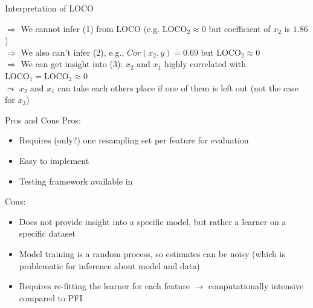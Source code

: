 \documentclass[11pt,compress,t,notes=noshow, aspectratio=169, xcolor=table]{beamer}
\begin{document}
\begin{frame}{Interpretation of LOCO}
\lz\pause

$\Rightarrow$ We cannot infer (1) from LOCO (e.g. $\text{LOCO}_2 \approx 0$ but coefficient of $x_2$ is $1.86$)\\\pause
$\Rightarrow$ We also can't infer (2), e.g., $Cor(x_2, y) = 0.69$ but $\text{LOCO}_2 \approx 0$\\\pause
$\Rightarrow$ We can get insight into (3): $x_2$ and $x_1$ highly correlated with $\text{LOCO}_1 = \text{LOCO}_2  \approx 0$ \\
\phantom{$\Rightarrow$} $\leadsto$ $x_2$ and $x_1$ can take each others place if one of them is left out (not the case for $x_3$)
\end{frame}

\begin{frame}{Pros and Cons}
  Pros:
  \begin{itemize}
    \item Requires (only?) one resampling set per feature for evaluation
    \item Easy to implement
    \item Testing framework available in 
  \end{itemize}
%
  Cons:
  \begin{itemize}
    \item Does not provide insight into a specific model, but rather a learner on a specific dataset
    \item Model training is a random process, so estimates can be noisy (which is problematic for inference about model and data)
    \item Requires re-fitting the learner for each feature $\rightarrow$ computationally intensive compared to PFI
  \end{itemize}
\end{frame}


\endlecture
\end{document}
